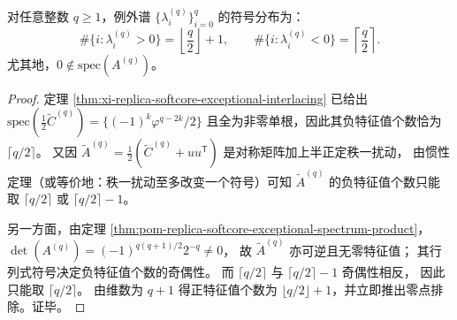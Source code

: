 \begin{corollary}[符号惯性与零点排除]\label{cor:xi-replica-softcore-exceptional-inertia}
对任意整数 \(q\ge 1\)，例外谱 \(\{\lambda_i^{(q)}\}_{i=0}^{q}\) 的符号分布为：
\[
\#\{i:\lambda_i^{(q)}>0\}=\left\lfloor\frac{q}{2}\right\rfloor+1,
\qquad
\#\{i:\lambda_i^{(q)}<0\}=\left\lceil\frac{q}{2}\right\rceil.
\]
尤其地，\(0\notin \mathrm{spec}(A^{(q)})\)。
\end{corollary}
\begin{proof}
定理 \ref{thm:xi-replica-softcore-exceptional-interlacing} 已给出
\(
\mathrm{spec}(\frac12\widetilde C^{(q)})=\{(-1)^k\varphi^{q-2k}/2\}
\)
且全为非零单根，因此其负特征值个数恰为 \(\lceil q/2\rceil\)。
又因 \(\widetilde A^{(q)}=\frac12(\widetilde C^{(q)}+uu^{\mathsf T})\) 是对称矩阵加上半正定秩一扰动，
由惯性定理（或等价地：秩一扰动至多改变一个符号）可知 \(\widetilde A^{(q)}\) 的负特征值个数只能取 \(\lceil q/2\rceil\) 或 \(\lceil q/2\rceil-1\)。
\par
另一方面，由定理 \ref{thm:pom-replica-softcore-exceptional-spectrum-product}，
\(
\det(A^{(q)})=(-1)^{q(q+1)/2}2^{-q}\neq 0
\)，
故 \(\widetilde A^{(q)}\) 亦可逆且无零特征值；
其行列式符号决定负特征值个数的奇偶性。
而 \(\lceil q/2\rceil\) 与 \(\lceil q/2\rceil-1\) 奇偶性相反，
因此只能取 \(\lceil q/2\rceil\)。
由维数为 \(q+1\) 得正特征值个数为 \(\lfloor q/2\rfloor+1\)，并立即推出零点排除。证毕。
\end{proof}

